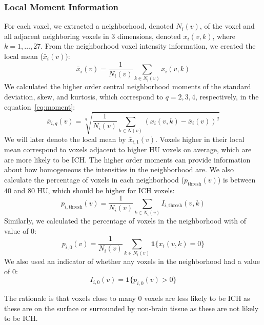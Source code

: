\documentclass[12pt]{report}
\begin{document}
\begin{refsection}
\subsubsection{Local Moment Information} For each voxel, we extracted a neighborhood, denoted $N_i(v)$, of the voxel and all adjacent neighboring voxels in $3$ dimensions, denoted $x_i(v, k)$, where $k = 1, \dots, 27$.  From the neighborhood voxel intensity information, we created the local mean ($\bar{x}_{i}(v)$):
\begin{equation}
\bar{x}_{i}(v) = \frac{1}{N_i(v)} \sum_{k \in N_i(v)} x_i(v, k) \label{eq:mean}
\end{equation}
We calculated the higher order central neighborhood moments of the standard deviation, skew, and kurtosis, which correspond to $q = 2,3,4$, respectively, in the equation~\eqref{eq:moment}:
\begin{equation}
\bar{x}_{i, q}(v) = \sqrt[q]{ {\frac{1}{N_i(v)} \sum_{k \in N(v)} \left(x_i(v, k) - \bar{x}_i(v)\right)^q} }\label{eq:moment}
\end{equation}
We will later denote the local mean by $\bar{x}_{i, 1}(v)$.  Voxels higher in their local mean correspond to voxels adjacent to higher HU voxels on average, which are are more likely to be ICH.  The higher order moments can provide information about how homogeneous the intensities in the neighborhood are.  We also calculate the percentage of voxels in each neighborhood ($p_{\text{thresh}}(v)$) is between $40$ and $80$ HU, which should be higher for ICH voxels:
\begin{equation}
p_{i,\text{thresh}}(v) = \frac{1}{N_i(v)} \sum_{k \in N_i(v)} I_{i,\text{thresh}}(v, k) \label{eq:pct}
\end{equation}
Similarly, we calculated the percentage of voxels in the neighborhood with of value of $0$:
\begin{equation}
p_{i,0}(v) = \frac{1}{N_i(v)} \sum_{k \in N_i(v)} \mathbf{1}\{ x_i(v, k) = 0 \} \label{eq:pct0}
\end{equation}
We also used an indicator of whether any voxels in the neighborhood had a value of $0$:
\begin{equation}
I_{i,0}(v) = \mathbf{1}\{ p_{i,0}(v) > 0 \} \label{eq:I0}
\end{equation}

The rationale is that voxels close to many $0$ voxels are less likely to be ICH as these are on the surface or surrounded by non-brain tissue as these are not likely to be ICH. 

 


\end{refsection}
\end{document}
